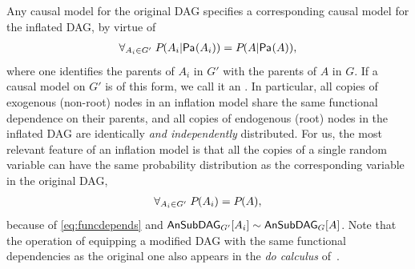{Any causal model for the original DAG specifies a corresponding causal model for the inflated DAG, by virtue of
\begin{align}\label{eq:funcdepends}
\forall_{A_i\in G'}\; \pdf{A_i|\Pa{A_i}}=\pdf{A|\Pa{A}},
\end{align}
where one identifies the parents of $A_i$ in $G'$ with the parents of $A$ in $G$. If a causal model on $G'$ is of this form, we call it an . In particular, all copies of exogenous (non-root) nodes in an inflation model share the same functional dependence on their parents, and all copies of endogenous (root) nodes in the inflated DAG are identically \emph{and independently} distributed. For us, the most relevant feature of an inflation model is that all the copies of a single random variable can have the same probability distribution as the corresponding variable in the original DAG,
\begin{align}\label{eq:singlevariatecoincidence}
\forall_{A_i\in G'}\; \pdf{A_i}=\pdf{A},
\end{align}
because of \cref{eq:funcdepends} and $\ansubgraph[G']{A_i}\sim\ansubgraph[G]{A}$. Note that the operation of equipping a modified DAG with the same functional dependencies as the original one also appears in the \emph{do calculus} of~\citet{pearl2009causality}. 

}
